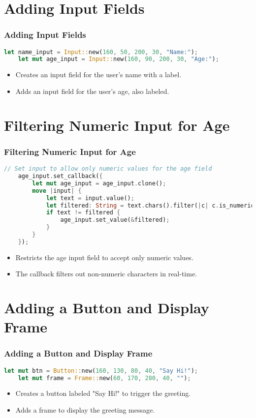 \documentclass[aspectratio=169, table]{beamer}
\begin{document}
\section{Adding Input Fields}
\begin{frame}[fragile]
\frametitle{Adding Input Fields}
\begin{lstlisting}[language=Rust]
	let name_input = Input::new(160, 50, 200, 30, "Name:");
	let mut age_input = Input::new(160, 90, 200, 30, "Age:");
\end{lstlisting}
\begin{itemize}
	\item Creates an input field for the user's name with a label.
	\item Adds an input field for the user's age, also labeled.
\end{itemize}
\end{frame}

\section{Filtering Numeric Input for Age}
\begin{frame}[fragile]
\frametitle{Filtering Numeric Input for Age}
\vspace{15pt}
\begin{lstlisting}[language=Rust]
	// Set input to allow only numeric values for the age field
	age_input.set_callback({
		let mut age_input = age_input.clone();
		move |input| {
			let text = input.value();
			let filtered: String = text.chars().filter(|c| c.is_numeric()).collect();
			if text != filtered {
				age_input.set_value(&filtered);
			}
		}
	});
\end{lstlisting}
\begin{itemize}
	\item Restricts the age input field to accept only numeric values.
	\item The callback filters out non-numeric characters in real-time.
\end{itemize}
\end{frame}

\section{Adding a Button and Display Frame}
\begin{frame}[fragile]
\frametitle{Adding a Button and Display Frame}
\begin{lstlisting}[language=Rust]
	let mut btn = Button::new(160, 130, 80, 40, "Say Hi!");
	let mut frame = Frame::new(60, 170, 280, 40, "");
\end{lstlisting}
\begin{itemize}
	\item Creates a button labeled "Say Hi!" to trigger the greeting.
	\item Adds a frame to display the greeting message.
\end{itemize}
\end{frame}
\end{document}

